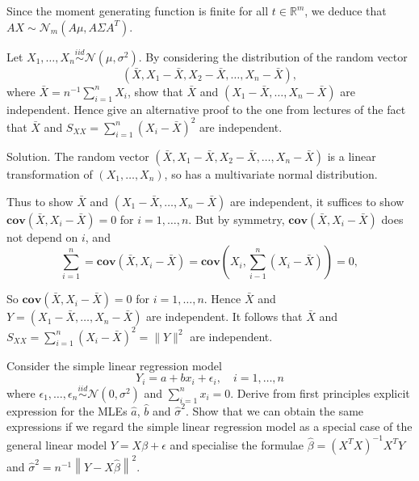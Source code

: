 Since the moment generating function is finite for all $t\in\mathbb{R}^m$, we deduce that $AX\sim \mathcal{N}_m(A\mu,A\Sigma A^T)$.





\item Let $X_1,\dots,X_n\stackrel{iid}{\sim}\mathcal{N}(\mu,\sigma^2)$. By considering the distribution of the random vector
\begin{equation}
\left(\bar{X},X_1-\bar{X},X_2-\bar{X},\dots,X_n-\bar{X}\right),
\end{equation}
where $\bar{X}=n^{-1}\sum^n_{i=1}X_i$, show that $\bar{X}$ and $\left(X_1-\bar{X},\dots,X_n-\bar{X}\right)$ are independent. Hence give an alternative proof to the one from lectures of the fact that $\bar{X}$ and $S_{XX}=\sum^n_{i=1}(X_i-\bar{X})^2$ are independent.



Solution. The random vector $\left(\bar{X},X_1-\bar{X},X_2-\bar{X},\dots,X_n-\bar{X}\right)$ is a linear transformation of $\left(X_1,\dots,X_n\right)$, so has a multivariate normal distribution.

Thus to show $\bar{X}$ and $\left(X_1-\bar{X},\dots,X_n-\bar{X}\right)$ are independent, it suffices to show $\mathbf{cov}\left(\bar{X},X_i-\bar{X}\right)=0$ for $i=1,\dots,n$. But by symmetry, $\mathbf{cov}\left(\bar{X},X_i-\bar{X}\right)$ does not depend on $i$, and
\begin{equation}
\sum^n_{i=1} = \mathbf{cov}\left(\bar{X},X_i-\bar{X}\right) = \mathbf{cov}\left(X_i,\sum^n_{i-1}\left(X_i-\bar{X}\right)\right) = 0,
\end{equation}

So $\mathbf{cov}\left(\bar{X},X_i-\bar{X}\right)=0$ for $i=1,\dots,n$. Hence $\bar{X}$ and $Y=\left(X_1-\bar{X},\dots,X_n-\bar{X}\right)$ are independent. It follows that $\bar{X}$ and $S_{XX}=\sum^n_{i=1}(X_i-\bar{X})^2=\|Y\|^2$ are independent.





\item Consider the simple linear regression model
\begin{equation}
Y_i = a + bx_i+\epsilon_i,\quad i=1,\dots,n
\end{equation}
where $\epsilon_1,\dots,\epsilon_n\stackrel{iid}{\sim}\mathcal{N}(0,\sigma^2)$ and $\sum^n_{i=1}x_i=0$. Derive from first principles explicit expression for the MLEs $\hat{a}$, $\hat{b}$ and $\hat{\sigma}^2$. Show that we can obtain the same expressions if we regard the simple linear regression model as a special case of the general linear model $Y=X\beta+\epsilon$ and specialise the formulae $\hat{\beta}=(X^TX)^{-1}X^TY$ and $\hat{\sigma}^2=n^{-1}\left\|Y-X\hat{\beta}\right\|^2$.

